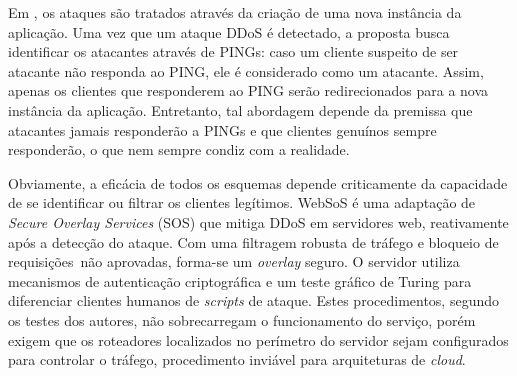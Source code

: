 Em \cite{Bakshi:10}, os ataques são tratados através da criação de uma nova instância da aplicação. Uma vez que um ataque DDoS é detectado, a proposta busca identificar os atacantes através de PINGs: caso um cliente suspeito de ser atacante não responda ao PING, ele é considerado como um atacante. Assim, apenas os clientes que responderem ao PING serão 
redirecionados para a nova instância da aplicação. Entretanto, tal abordagem depende da premissa que atacantes jamais responderão a PINGs e que clientes genuínos sempre responderão, o que nem sempre condiz com a realidade.





Obviamente, a eficácia de todos os esquemas depende criticamente da capacidade de se identificar ou filtrar os clientes legítimos. 
%
WebSoS \cite{Stavrou:2005:WOS:1090583.1648614} é uma adaptação de \emph{Secure Overlay Services} (SOS) \cite{Keromytis:2002:SSO:964725.633032} que mitiga DDoS em servidores web, reativamente após a detecção do ataque. Com uma filtragem robusta de tráfego e bloqueio de requisições~não aprovadas, forma-se um \emph{overlay} seguro. O servidor utiliza mecanismos de autenticação criptográfica e um teste gráfico de Turing \cite{Dietrich00analyzingdistributed} para diferenciar clientes humanos de \emph{scripts} de ataque. Estes procedimentos, segundo os testes dos autores, não sobrecarregam o funcionamento do serviço, porém exigem que os roteadores localizados no perímetro do servidor sejam configurados para controlar o tráfego, procedimento inviável para arquiteturas de \emph{cloud}.
